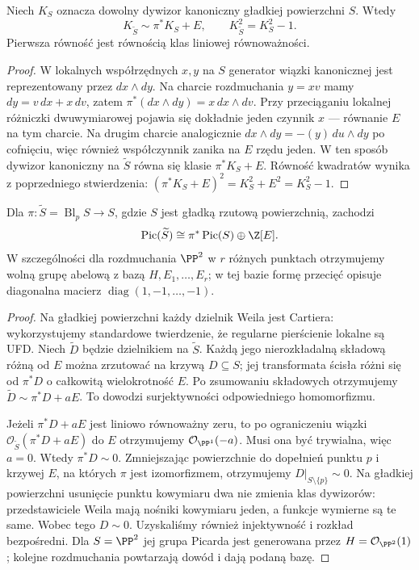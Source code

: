 \begin{stwierdzenie}
\label{st:ga6-Kblowup}
Niech $K_S$ oznacza dowolny dywizor kanoniczny
gładkiej powierzchni $S$. Wtedy
\[
 K_{\widetilde S}\sim\pi^*K_S+E,
 \qquad K_{\widetilde S}^2=K_S^2-1.
\]
Pierwsza równość jest równością klas liniowej równoważności.
\end{stwierdzenie}
\begin{proof}
W lokalnych współrzędnych $x,y$ na $S$ generator
wiązki kanonicznej jest reprezentowany przez
$dx\wedge dy$. Na charcie rozdmuchania $y=xv$
mamy $dy=v\,dx+x\,dv$, zatem
$\pi^*(dx\wedge dy)=x\,dx\wedge dv$.
Przy przeciąganiu lokalnej różniczki dwuwymiarowej
pojawia się dokładnie jeden czynnik $x$ — równanie
$E$ na tym charcie. Na drugim charcie analogicznie
$dx\wedge dy=-(y)\,du\wedge dy$ po cofnięciu,
więc również współczynnik zanika na $E$ rzędu jeden.
W ten sposób dywizor kanoniczny na $\widetilde S$
równa się klasie $\pi^*K_S+E$.
Równość kwadratów wynika z poprzedniego stwierdzenia:
$(\pi^*K_S+E)^2=K_S^2+E^2=K_S^2-1$.
\end{proof}

\begin{stwierdzenie}
\label{st:ga6-pic-blowup}
Dla $\pi:\widetilde S=\operatorname{Bl}_pS\to S$,
gdzie $S$ jest gładką rzutową powierzchnią, zachodzi
\[
 \operatorname{Pic}(\widetilde S)\cong
 \pi^*\operatorname{Pic}(S)\oplus\Z[E].
\]
W szczególności dla rozdmuchania $\PP^2$ w $r$
różnych punktach otrzymujemy wolną grupę abelową
z bazą $H,E_1,\ldots,E_r$; w tej bazie formę
przecięć opisuje diagonalna macierz
$\operatorname{diag}(1,-1,\ldots,-1)$.
\end{stwierdzenie}
\begin{proof}
Na gładkiej powierzchni każdy dzielnik Weila jest
Cartiera: wykorzystujemy standardowe twierdzenie,
że regularne pierścienie lokalne są UFD. Niech
$\widetilde D$ będzie dzielnikiem na $\widetilde S$.
Każdą jego nierozkładalną składową różną od $E$
można zrzutować na krzywą $D\subseteq S$; jej
transformata ścisła różni się od $\pi^*D$ o
całkowitą wielokrotność $E$. Po zsumowaniu składowych
otrzymujemy $\widetilde D\sim\pi^*D+aE$.
To dowodzi surjektywności odpowiedniego homomorfizmu.

Jeżeli $\pi^*D+aE$ jest liniowo równoważny zeru,
to po ograniczeniu wiązki $\mathcal O_{\widetilde S}(\pi^*D+aE)$
do $E$ otrzymujemy $\mathcal O_{\PP^1}(-a)$.
Musi ona być trywialna, więc $a=0$. Wtedy
$\pi^*D\sim0$. Zmniejszając powierzchnie do
dopełnień punktu $p$ i krzywej $E$, na których
$\pi$ jest izomorfizmem, otrzymujemy $D|_{S\setminus\{p\}}\sim0$.
Na gładkiej powierzchni usunięcie punktu kowymiaru
dwa nie zmienia klas dywizorów: przedstawiciele
Weila mają nośniki kowymiaru jeden, a funkcje
wymierne są te same. Wobec tego $D\sim0$.
Uzyskaliśmy również injektywność i rozkład bezpośredni.
Dla $S=\PP^2$ jej grupa Picarda jest generowana
przez $H=\mathcal O_{\PP^2}(1)$; kolejne rozdmuchania
powtarzają dowód i dają podaną bazę.
\end{proof}

